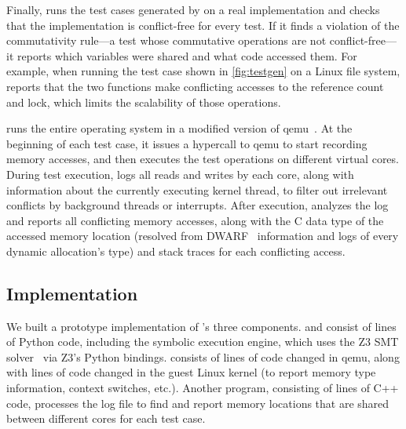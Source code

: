 Finally, \mtrace runs the test cases generated by \testgen on
a real implementation and checks that the implementation is
conflict-free for every test.  If it finds a violation of the
commutativity rule---a test whose commutative operations are not
conflict-free---it reports which variables were shared and what code
accessed them.
%
For example, when running the
test case shown in \cref{fig:testgen} on a Linux 
file system, \mtrace reports that the two functions make conflicting
accesses to the  reference count and lock, which limits
the scalability of those operations.

\mtrace runs the entire operating system in a modified version of
qemu~\cite{qemu}.  At the beginning of each test case, it issues a hypercall to
qemu to start recording memory accesses, and then executes the test
operations on different virtual cores.  During test execution,
\mtrace logs all reads and writes by each core, along with
information about the currently executing kernel thread,
to filter out irrelevant conflicts by background threads or
interrupts.  After execution, \mtrace analyzes
the log and reports all conflicting memory accesses, along with the C
data type of the accessed memory location (resolved from
DWARF~\cite{dwarf} information and logs
of every dynamic allocation's type) and stack traces for each conflicting
access.

\subsection{Implementation}
\label{sec:tool:impl}

We built a prototype implementation of \tool's three components.
\analyzer and \testgen consist of
 lines of Python code,
including the symbolic execution engine, which uses the Z3 SMT
solver~\cite{demoura:z3}
via Z3's Python bindings.
\mtrace consists of  lines of
code changed in qemu, along with 
lines of code changed in the guest
Linux kernel (to report memory type information, context switches, etc.).
Another program, consisting of 
lines of C++ code, processes the
log file to find and report memory locations that are shared between different
cores for each test case.



